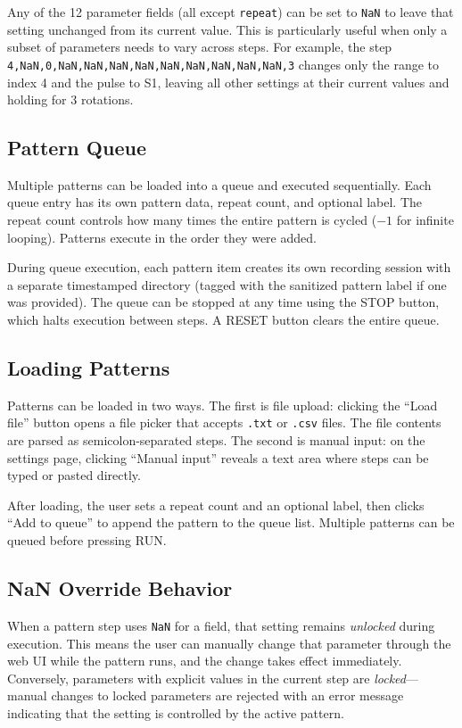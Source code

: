 \documentclass[11pt,letterpaper]{article}
\begin{document}
Any of the 12 parameter fields (all except \texttt{repeat}) can be set to \texttt{NaN} to leave that setting unchanged from its current value. This is particularly useful when only a subset of parameters needs to vary across steps. For example, the step \texttt{4,NaN,0,NaN,NaN,NaN,NaN,NaN,NaN,NaN,NaN,NaN,3} changes only the range to index 4 and the pulse to S1, leaving all other settings at their current values and holding for 3 rotations.

\subsection{Pattern Queue}
\label{subsec:pattern-queue}

Multiple patterns can be loaded into a queue and executed sequentially. Each queue entry has its own pattern data, repeat count, and optional label. The repeat count controls how many times the entire pattern is cycled ($-1$ for infinite looping). Patterns execute in the order they were added.

During queue execution, each pattern item creates its own recording session with a separate timestamped directory (tagged with the sanitized pattern label if one was provided). The queue can be stopped at any time using the STOP button, which halts execution between steps. A RESET button clears the entire queue.

\subsection{Loading Patterns}
\label{subsec:pattern-loading}

Patterns can be loaded in two ways. The first is file upload: clicking the ``Load file'' button opens a file picker that accepts \texttt{.txt} or \texttt{.csv} files. The file contents are parsed as semicolon-separated steps. The second is manual input: on the settings page, clicking ``Manual input'' reveals a text area where steps can be typed or pasted directly.

After loading, the user sets a repeat count and an optional label, then clicks ``Add to queue'' to append the pattern to the queue list. Multiple patterns can be queued before pressing RUN.

\subsection{NaN Override Behavior}
\label{subsec:pattern-nan}

When a pattern step uses \texttt{NaN} for a field, that setting remains \textit{unlocked} during execution. This means the user can manually change that parameter through the web UI while the pattern runs, and the change takes effect immediately. Conversely, parameters with explicit values in the current step are \textit{locked}---manual changes to locked parameters are rejected with an error message indicating that the setting is controlled by the active pattern.
\end{document}
